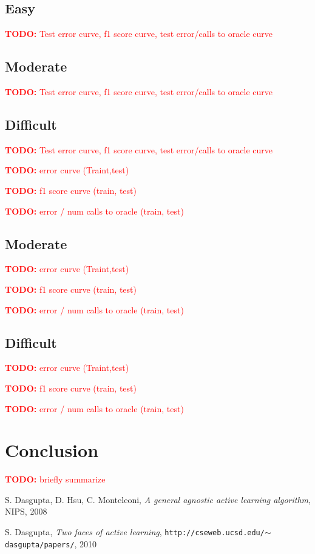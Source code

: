\documentclass[paper=a4, fontsize=11pt]{scrartcl}
\numberwithin{equation}{section}    %
\numberwithin{figure}{section}      %
\numberwithin{table}{section}       %
\newcommand{\TODO}[1]{\textcolor{red}{\textbf{TODO: } #1}}
\numberwithin{equation}{section}    %
\numberwithin{figure}{section}      %
\numberwithin{table}{section}       %
\begin{document}
\subsection{Easy}

\TODO{Test error curve, f1 score curve, test error/calls to oracle curve}

\subsection{Moderate}
\TODO{Test error curve, f1 score curve, test error/calls to oracle curve}


\subsection{Difficult}
\TODO{Test error curve, f1 score curve, test error/calls to oracle curve}


\TODO{error curve (Traint,test)}

\TODO{f1 score curve (train, test)}

\TODO{error / num calls to oracle (train, test) }

\subsection{Moderate}


\TODO{error curve (Traint,test)}

\TODO{f1 score curve (train, test)}

\TODO{error / num calls to oracle (train, test) }


\subsection{Difficult}


\TODO{error curve (Traint,test)}

\TODO{f1 score curve (train, test)}

\TODO{error / num calls to oracle (train, test) }


\section{Conclusion}

\TODO{briefly summarize}


\begin{thebibliography}{1}


S. Dasgupta, D. Hsu, C. Monteleoni, \emph{A general agnostic active learning algorithm}, NIPS, 2008 

S. Dasgupta, \emph{Two faces of active learning}, \texttt{http://cseweb.ucsd.edu/$\sim$dasgupta/papers/}, 2010

\end{thebibliography}
\end{document}
